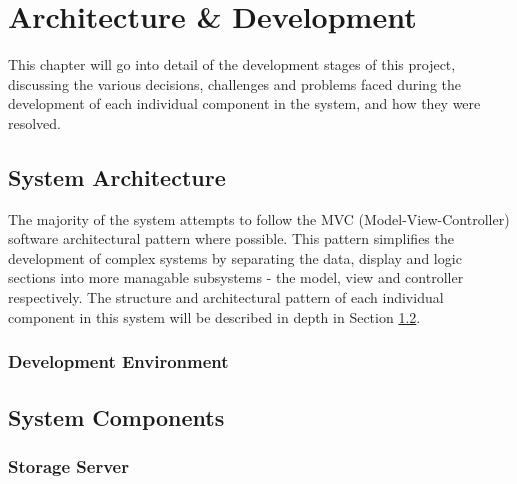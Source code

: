 \chapter{Architecture \& Development}
This chapter will go into detail of the development stages of this project, discussing the various decisions, challenges and problems faced during the development of each individual component in the system, and how they were resolved.

\section{System Architecture}

The majority of the system attempts to follow the MVC (Model-View-Controller) software architectural pattern where possible. This pattern simplifies the development of complex systems by separating the data, display and logic sections into more managable subsystems - the model, view and controller respectively. The structure and architectural pattern of each individual component in this system will be described in depth in Section \ref{section:systemcomponents}.




	\subsection{Development Environment}


\section{System Components}
\label{section:systemcomponents}
% 
	\subsection{Storage Server}

